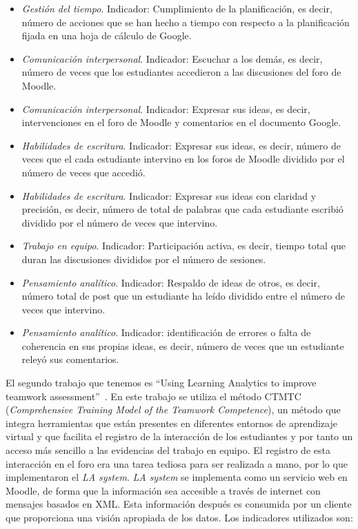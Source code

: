 \begin{itemize}
\item \emph{Gestión del tiempo}. Indicador: Cumplimiento de la planificación, es decir, número de acciones que se han hecho a tiempo con respecto a la planificación fijada en una hoja de cálculo de Google.
\item \emph{Comunicación interpersonal}. Indicador: Escuchar a los demás, es decir, número de veces que los estudiantes accedieron a las discusiones del foro de Moodle.
\item \emph{Comunicación interpersonal}. Indicador: Expresar sus ideas, es decir, intervenciones en el foro de Moodle y comentarios en el documento Google.
\item \emph{Habilidades de escritura}. Indicador: Expresar sus ideas, es decir, número de veces que el cada estudiante intervino en los foros de Moodle dividido por el número de veces que accedió.
\item \emph{Habilidades de escritura}. Indicador: Expresar sus ideas con claridad y precisión, es decir, número de total de palabras que cada estudiante escribió dividido por el número de veces que intervino.
\item \emph{Trabajo en equipo}. Indicador: Participación activa, es decir, tiempo total que duran las discusiones divididos por el número de sesiones.
\item \emph{Pensamiento analítico}. Indicador: Respaldo de ideas de otros, es decir, número total de post que un estudiante ha leído dividido entre el número de veces que intervino.
\item \emph{Pensamiento analítico}. Indicador: identificación de errores o falta de coherencia en sus propias ideas, es decir, número de veces que un estudiante releyó sus comentarios.
\end{itemize}

El segundo trabajo que tenemos es “Using Learning Analytics to improve teamwork assessment”~\cite{fidalgo:2015}. En este trabajo se utiliza el método CTMTC (\emph{Comprehensive Training Model of the Teamwork Competence}), un método que integra herramientas que están presentes en diferentes entornos de aprendizaje virtual y que facilita el registro de la interacción de los estudiantes y por tanto un acceso más sencillo a las evidencias del trabajo en equipo. El registro de esta interacción en el foro era una tarea tediosa para ser realizada a mano, por lo que implementaron el \emph{LA system}. \emph{LA system} se implementa como un servicio web en Moodle, de forma que la información sea accesible a través de internet con mensajes basados en XML. Esta información después es consumida por un cliente que proporciona una visión apropiada de los datos. Los indicadores utilizados son:

